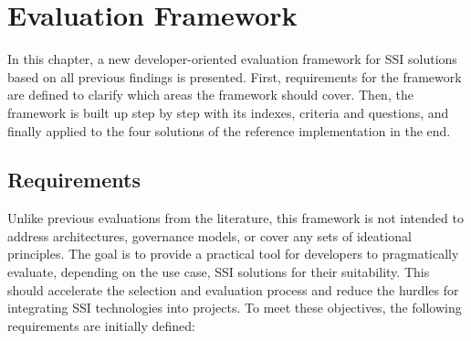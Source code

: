 
\chapter{Evaluation Framework}\label{chapter: framework}
    
    In this chapter, a new developer-oriented evaluation framework for \ac{SSI} solutions based on all previous findings is presented. First, requirements for the framework are defined to clarify which areas the framework should cover. Then, the framework is built up step by step with its indexes, criteria and questions, and finally applied to the four solutions of the reference implementation in the end. 
    
	\section{Requirements}
	
	Unlike previous evaluations from the literature, this framework is not intended to address architectures, governance models, or cover any sets of ideational principles. The goal is to provide a practical tool for developers to pragmatically evaluate, depending on the use case, \ac{SSI} solutions for their suitability. This should accelerate the selection and evaluation process and reduce the hurdles for integrating \ac{SSI} technologies into projects. To meet these objectives, the following requirements are initially defined:
	

